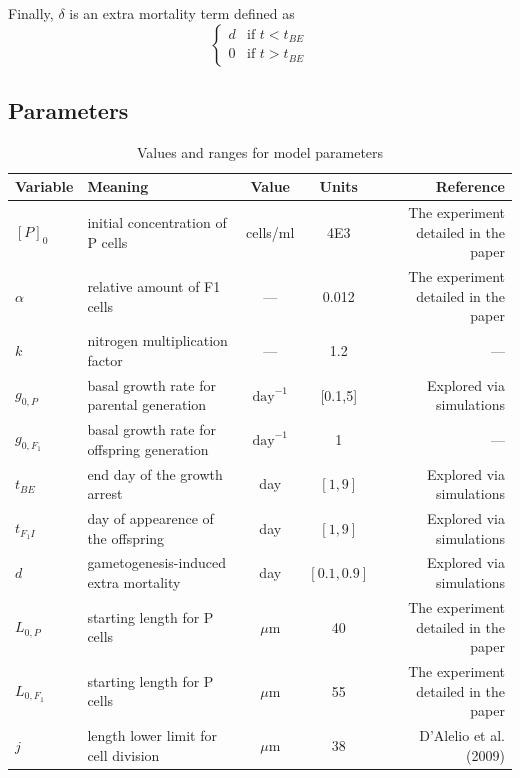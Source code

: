 \documentclass[a4paper,oneside]{book}
\begin{document}
    Finally, $\delta$ is an extra mortality term defined as
    \[
      \begin{cases}
        d & \mbox{if } t < t_{BE} \\
        0 & \mbox{if } t > t_{BE}
      \end{cases}
    \]
    
    \subsection*{Parameters}
      \begin{table}
        \caption{Values and ranges for model parameters}\label{tbl1}
         \begin{tabular}{@{}llccr@{}}
          \toprule
            \textbf{Variable}&\textbf{Meaning} & \textbf{Value} & \textbf{Units} & \textbf{Reference}\\
          \midrule
            ${[P]}_{0}$     & initial concentration of P cells           & cells/ml          & 4E3           & The experiment detailed in the paper\\
            $\alpha$        & relative amount of F1 cells                & ---               & 0.012         & The experiment detailed in the paper\\
            $k$             & nitrogen multiplication factor             & ---               & 1.2           & ---\\
            $g_{0, P}$      & basal growth rate for parental generation  & $\text{day}^{-1}$ & {[0.1,5]}     & Explored via simulations\\
            $g_{0, F_{1}}$  & basal growth rate for offspring generation & $\text{day}^{-1}$ & 1             & ---\\
            $t_{BE}$        & end day of the growth arrest               & day               & ${[1,9]}$     & Explored via simulations\\
            $t_{F_{1}I}$    & day of appearence of the offspring         & day               & ${[1,9]}$     & Explored via simulations\\
            $d$             & gametogenesis-induced extra mortality      & day               & ${[0.1,0.9]}$ & Explored via simulations\\
            $L_{0,P}$       & starting length for P cells                &$\mu$m             & 40            & The experiment detailed in the paper\\
            $L_{0,{F_{1}}}$ & starting length for P cells                &$\mu$m             & 55            & The experiment detailed in the paper\\
            $j$             & length lower limit for cell division       &$\mu$m             & 38            & D'Alelio et al. (2009)\\
          \bottomrule
        \end{tabular}
      \end{table}
%
\end{document}
